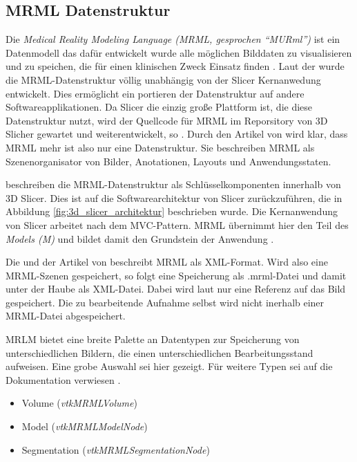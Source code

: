 \subsection{MRML Datenstruktur}
\label{subsec:mrml_datenstruktur} Die \textit{Medical Reality Modeling Language
(MRML, gesprochen “MURml”)} ist ein Datenmodell das dafür entwickelt wurde alle möglichen
Bilddaten zu visualisieren und zu speichen, die für einen klinischen Zweck
Einsatz finden \citep[vgl.][]{slicer2024}. Laut der \citet{slicer2024} wurde die
MRML-Datenstruktur völlig unabhängig von der Slicer Kernanwedung entwickelt.
Dies ermöglicht ein portieren der Datenstruktur auf andere Softwareapplikationen.
Da Slicer die einzig große Plattform ist, die diese Datenstruktur nutzt, wird der
Quellcode für MRML im Reporsitory von 3D Slicher gewartet und weiterentwickelt,
so \citet{slicer2024}. Durch den Artikel von \citet[Seite 1327]{fedorov2012slicer}
wird klar, dass MRML mehr ist also nur eine Datenstruktur. Sie beschreiben MRML
als Szenenorganisator von Bilder, Anotationen, Layouts und Anwendungsstaten.

\citet[Seite 1331]{fedorov2012slicer} beschreiben die MRML-Datenstruktur als
Schlüsselkomponenten innerhalb von 3D Slicer. Dies ist auf die Softwarearchitektur
von Slicer zurückzuführen, die in Abbildung \ref{fig:3d_slicer_architektur}
beschrieben wurde. Die Kernanwendung von Slicer arbeitet nach dem MVC-Pattern.
MRML übernimmt hier den Teil des \textit{Models (M)} und bildet damit den Grundstein
der Anwendung \citep[vgl.][Seite 1332]{fedorov2012slicer}.

Die \citet{slicer2024} und der Artikel von \citet[Seite 1327]{fedorov2012slicer}
beschreibt MRML als XML-Format. Wird also eine MRML-Szenen gespeichert, so folgt
eine Speicherung als .mrml-Datei und damit unter der Haube als XML-Datei. Dabei
wird laut \citet{slicer2024} nur eine Referenz auf das Bild gespeichert. Die zu
bearbeitende Aufnahme selbst wird nicht inerhalb einer MRML-Datei abgespeichert.

MRLM bietet eine breite Palette an Datentypen zur Speicherung von
unterschiedlichen Bildern, die einen unterschiedlichen Bearbeitungsstand aufweisen.
Eine grobe Auswahl sei hier gezeigt. Für weitere Typen sei auf die Dokumentation
verwiesen \citep[vgl.][]{slicer2024}.

\begin{itemize}
	\item Volume (\textit{vtkMRMLVolume})

	\item Model (\textit{vtkMRMLModelNode})

	\item Segmentation (\textit{vtkMRMLSegmentationNode})
\end{itemize}

